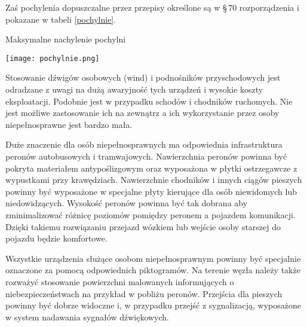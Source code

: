\documentclass[twoside,12pt]{article}
\begin{document}
	 Zaś pochylenia dopuszczalne przez przepisy określone są w §\,70 rozporządzenia i pokazane w tabeli \ref{pochylnie}.
	 	\begin{table}[H]
		\centering
		\caption{Maksymalne nachylenie pochylni}
		\texttt{[image: pochylnie.png]}\\
		\label{pochylnie}
	\end{table}
	
	Stosowanie dźwigów osobowych (wind) i podnośników przyschodowych jest odradzane z uwagi na dużą awaryjność tych urządzeń i wysokie koszty eksploatacji. Podobnie jest w przypadku schodów i chodników ruchomych. Nie jest możliwe zastosowanie ich na zewnątrz a ich wykorzystanie przez osoby niepełnosprawne jest bardzo mała. 
	
	Duże znaczenie dla osób niepełnosprawnych ma odpowiednia infrastruktura peronów autobusowych i tramwajowych. Nawierzchnia peronów powinna być pokryta materiałem antypoślizgowym oraz wyposażona w płytki ostrzegawcze z wypustkami przy krawędziach. Nawierzchnie chodników i innych ciągów pieszych powinny być wyposażone w specjalne płyty kierujące dla osób niewidomych lub niedowidzących. Wysokość peronów powinna być tak dobrana aby zminimalizować różnicę poziomów pomiędzy peronem a pojazdem komunikacji. Dzięki takiemu rozwiązaniu przejazd wózkiem lub wejście osoby starszej do pojazdu będzie komfortowe.
	
	Wszystkie urządzenia służące osobom niepełnosprawnym powinny być specjalnie oznaczone za pomocą odpowiednich piktogramów. Na terenie węzła należy także rozważyć stosowanie powierzchni malowanych informujących o niebezpieczeństwach na przykład w pobliżu peronów. Przejścia dla pieszych powinny być dobrze widoczne i, w przypadku przejść z sygnalizacją, wyposażone w system nadawania sygnałów dźwiękowych. 
	 
\end{document}
